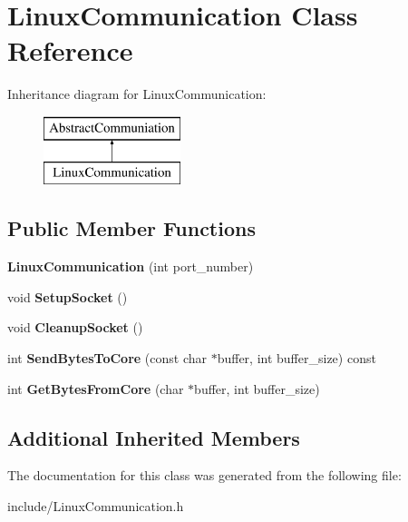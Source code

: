 \hypertarget{class_linux_communication}{}\section{Linux\+Communication Class Reference}
\label{class_linux_communication}
Inheritance diagram for Linux\+Communication\+:\begin{figure}[H]
\begin{center}
\leavevmode
\includegraphics[height=2.000000cm]{class_linux_communication}
\end{center}
\end{figure}
\subsection*{Public Member Functions}
\begin{DoxyCompactItemize}
\item 
\hypertarget{class_linux_communication_ab18ccae5958d77b1e1a51b19ac5ff875}{}\label{class_linux_communication_ab18ccae5958d77b1e1a51b19ac5ff875} 
{\bfseries Linux\+Communication} (int port\+\_\+number)
\item 
\hypertarget{class_linux_communication_ac73a679c9601fc3f59ad572306f6ea11}{}\label{class_linux_communication_ac73a679c9601fc3f59ad572306f6ea11} 
void {\bfseries Setup\+Socket} ()
\item 
\hypertarget{class_linux_communication_a65fde2bd6e4000977ff38a2c8e49808b}{}\label{class_linux_communication_a65fde2bd6e4000977ff38a2c8e49808b} 
void {\bfseries Cleanup\+Socket} ()
\item 
\hypertarget{class_linux_communication_a2caae46991804776d4504811a1a31b86}{}\label{class_linux_communication_a2caae46991804776d4504811a1a31b86} 
int {\bfseries Send\+Bytes\+To\+Core} (const char $\ast$buffer, int buffer\+\_\+size) const
\item 
\hypertarget{class_linux_communication_aea3499292cf3d7fec441c2b88f7f5d1a}{}\label{class_linux_communication_aea3499292cf3d7fec441c2b88f7f5d1a} 
int {\bfseries Get\+Bytes\+From\+Core} (char $\ast$buffer, int buffer\+\_\+size)
\end{DoxyCompactItemize}
\subsection*{Additional Inherited Members}


The documentation for this class was generated from the following file\+:\begin{DoxyCompactItemize}
\item 
include/Linux\+Communication.\+h\end{DoxyCompactItemize}
